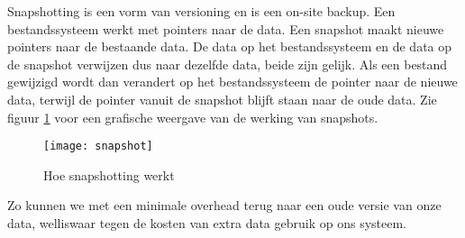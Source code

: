 Snapshotting is een vorm van versioning en is een on-site backup. Een bestandssysteem werkt met pointers naar de data. Een snapshot maakt nieuwe pointers naar de bestaande data. De data op het bestandssysteem en de data op de snapshot verwijzen dus naar dezelfde data, beide zijn gelijk. Als een bestand gewijzigd wordt dan verandert op het bestandssysteem de pointer naar de nieuwe data, terwijl de pointer vanuit de snapshot blijft staan naar de oude data. Zie figuur \ref{fig:snapshot} voor een grafische weergave van de werking van snapshots.

\begin{figure}[h]
\texttt{[image: snapshot]}
\centering
	\caption{Hoe snapshotting werkt}
	\label{fig:snapshot}
\end{figure}
Zo kunnen we met een minimale overhead terug naar een oude versie van onze data, welliswaar tegen de kosten van extra data gebruik op ons systeem.

